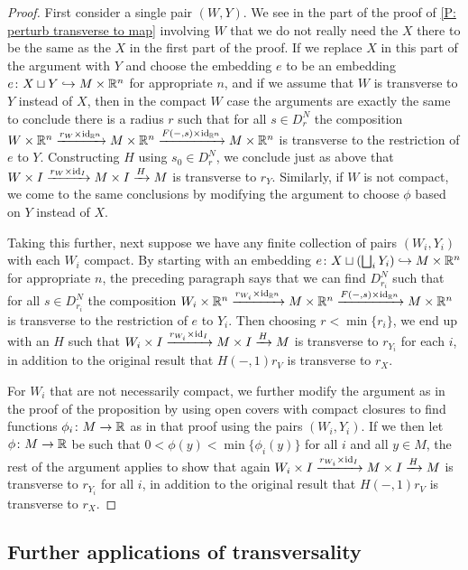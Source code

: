 \begin{proof}
	First consider a single pair $(W,Y)$.
	We see in the part of the proof of \cref{P: perturb transverse to map} involving $W$ that we do not really need the $X$ there to be the same as the $X$ in the first part of the proof.
	If we replace $X$ in this part of the argument with $Y$ and choose the embedding $e$ to be an embedding $e \colon X \sqcup Y \hookrightarrow M \times \mathbb{R}^n$ for appropriate $n$, and if we assume that $W$ is transverse to $Y$ instead of $X$, then in the compact $W$ case the arguments are exactly the same to conclude there is a radius $r$ such that for all $s \in D_r^N$ the composition $W \times \mathbb{R}^n \xrightarrow{r_W \times \mathrm{id}_{\mathbb{R}^n}} M \times \mathbb{R}^n \xrightarrow{F(-,s) \times \mathrm{id}_{\mathbb{R}^n}}M \times \mathbb{R}^n$ is transverse to the restriction of $e$ to $Y$.
	Constructing $H$ using $s_0 \in D_r^N$, we conclude just as above that $W \times I \xrightarrow{r_W \times \mathrm{id}_I} M \times I \xrightarrow{H} M$ is transverse to $r_Y$.
	Similarly, if $W$ is not compact, we come to the same conclusions by modifying the argument to choose $\phi$ based on $Y$ instead of $X$.

	Taking this further, next suppose we have any finite collection of pairs $(W_i, Y_i)$ with each $W_i$ compact.
	By starting with an embedding $e \colon X \sqcup (\bigsqcup_i Y_i) \hookrightarrow M \times \mathbb{R}^n$ for appropriate $n$, the preceding paragraph says that we can find $D_{r_i}^N$ such that for all $s \in D_{r_i}^N$ the composition $W_i \times \mathbb{R}^n \xrightarrow{r_{W_i} \times \mathrm{id}_{\mathbb{R}^n}} M \times \mathbb{R}^n \xrightarrow{F(-,s) \times \mathrm{id}_{\mathbb{R}^n}}M \times \mathbb{R}^n$ is transverse to the restriction of $e$ to $Y_i$.
	Then choosing $r < \min\{r_i\}$, we end up with an $H$ such that $W_i \times I \xrightarrow{r_{W_i} \times \mathrm{id}_I} M \times I \xrightarrow{H} M$ is transverse to $r_{Y_i}$ for each $i$, in addition to the original result that $H(-,1)r_V$ is transverse to $r_X$.

	For $W_i$ that are not necessarily compact, we further modify the argument as in the proof of the proposition by using open covers with compact closures to find functions $\phi_i \colon M \to \mathbb{R}$ as in that proof using the pairs $(W_i, Y_i)$.
	If we then let $\phi \colon M \to \mathbb{R}$ be such that $0 < \phi(y) < \min\{\phi_i(y)\}$ for all $i$ and all $y \in M$, the rest of the argument applies to show that again $W_i \times I \xrightarrow{r_{W_i} \times \mathrm{id}_I} M \times I \xrightarrow{H} M$ is transverse to $r_{Y_i}$ for all $i$, in addition to the original result that $H(-,1)r_V$ is transverse to $r_X$.
\end{proof}


\subsection{Further applications of transversality}\label{S: trans apps}

